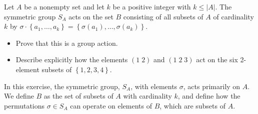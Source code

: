 \documentclass[12pt]{article}
\newenvironment{problem}[2][Exercise]{\begin{trivlist}
\item[\hskip \labelsep {\bfseries #1}\hskip \labelsep {\bfseries #2.}]}{\end{trivlist}}
\begin{document}
\begin{problem}{1.7.8}
Let $A$ be a nonempty set and let $k$ be a positive integer with $k\leq \left|A\right|$. The symmetric group $S_A$ acts on the set $B$ consisting of all subsets of $A$ of cardinality $k$ by $\sigma \cdot \left\{a_1,\ldots,a_k\right\} = \left\{\sigma\left(a_1\right),\ldots, \sigma\left(a_k\right)\right\}$.
\begin{itemize}
    \item Prove that this is a group action.
    \item Describe explicitly how the elements $\left(1\;2\right)$ and $\left(1\;2\;3\right)$ act on the six 2-element subsets of $\left\{1,2,3,4\right\}$.
\end{itemize}
\end{problem}
{\color{red}In this exercise, the symmetric group, $S_A$, with elements $\sigma$, acts primarily on $A$. We define $B$ as the set of subsets of $A$ with cardinality $k$, and define how the permutations $\sigma \in S_A$ can operate on  elements of $B$, which are subsets of $A$.}
\end{document}
